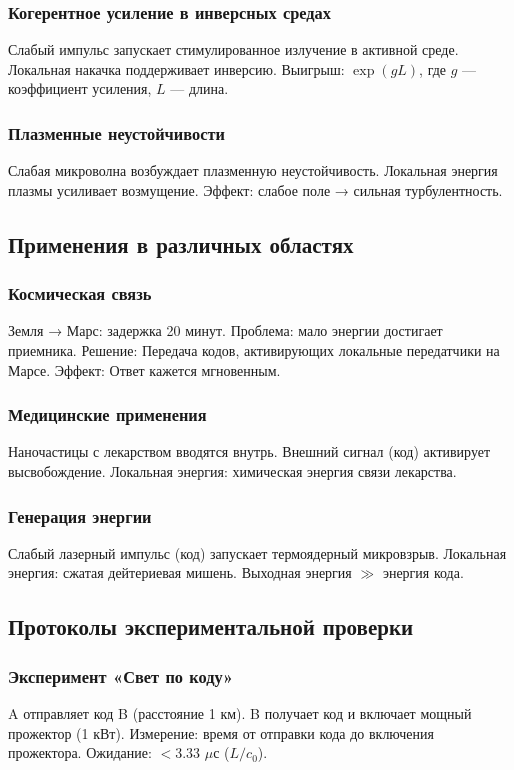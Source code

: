 \documentclass[11pt,a4paper]{article}
\begin{document}
	\subsubsection{Когерентное усиление в инверсных средах}
	Слабый импульс запускает стимулированное излучение в активной среде. Локальная накачка поддерживает инверсию. Выигрыш: $\exp(gL)$, где $g$ — коэффициент усиления, $L$ — длина.
	
	\subsubsection{Плазменные неустойчивости}
	Слабая микроволна возбуждает плазменную неустойчивость. Локальная энергия плазмы усиливает возмущение. Эффект: слабое поле → сильная турбулентность.
	
	\subsection{Применения в различных областях}
	
	\subsubsection{Космическая связь}
	Земля → Марс: задержка 20 минут. Проблема: мало энергии достигает приемника. Решение: Передача кодов, активирующих локальные передатчики на Марсе. Эффект: Ответ кажется мгновенным.
	
	\subsubsection{Медицинские применения}
	Наночастицы с лекарством вводятся внутрь. Внешний сигнал (код) активирует высвобождение. Локальная энергия: химическая энергия связи лекарства.
	
	\subsubsection{Генерация энергии}
	Слабый лазерный импульс (код) запускает термоядерный микровзрыв. Локальная энергия: сжатая дейтериевая мишень. Выходная энергия $\gg$ энергия кода.
	
	\subsection{Протоколы экспериментальной проверки}
	
	\subsubsection{Эксперимент «Свет по коду»}
	A отправляет код B (расстояние 1 км). B получает код и включает мощный прожектор (1 кВт). Измерение: время от отправки кода до включения прожектора. Ожидание: $< 3.33$ $\mu$с ($L/c_0$).
	
\end{document}
